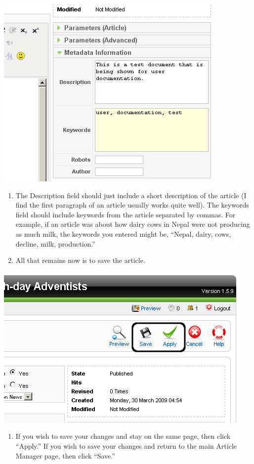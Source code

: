 \documentclass[letterpaper,10pt,english]{manual}
\begin{document}
{\hfill\includegraphics{articleMetadataEdition1.png}\hfill}
\begin{enumerate}
\item {} 
The Description field should just include a short description of the article (I find the first paragraph of an article usually works quite well).  The keywords field should include keywords from the article separated by commas.  For example, if an article was about how dairy cows in Nepal were not producing as much milk, the keywords you entered might be, “Nepal, dairy, cows, decline, milk, production.”

\item {} 
All that remains now is to save the article.

\end{enumerate}

{\hfill\includegraphics{articleSave1.png}\hfill}
\begin{enumerate}
\item {} 
If you wish to save your changes and stay on the same page, then click “Apply.”  If you wish to save your changes and return to the main Article Manager page, then click “Save.”

\end{enumerate}
\end{document}
